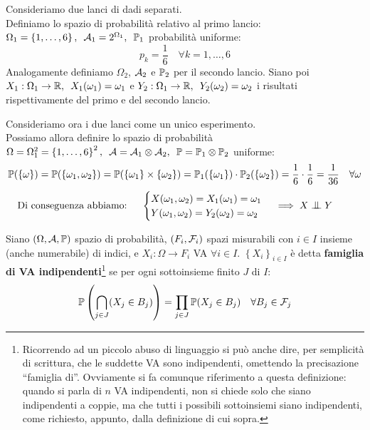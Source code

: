 \begin{ese}
  Consideriamo due lanci di dadi separati. \\
  Definiamo lo spazio di probabilità relativo al primo lancio: $\Omega_1 = \left \{1, \dots , 6 \right \}, \enspace  \mathcal A_1=2^{\Omega_1}, \enspace \mathbb P_1$ probabilità uniforme:
    $$p_k= \frac{1}{6} \quad \forall k=1, \dots , 6$$
  Analogamente definiamo $\Omega_2$, $\mathcal A_2$ e $\mathbb P_2$ per il secondo lancio.
  Siano poi $X_1: \Omega_1 \to \mathbb R, \enspace X_1(\omega_1)=\omega_1$ e $Y_2: \Omega_1 \to \mathbb R, \enspace Y_2(\omega_2)=\omega_2$ i risultati rispettivamente del primo e del secondo lancio.

  Consideriamo ora i due lanci come un unico esperimento. \\
  Possiamo allora definire lo spazio di probabilità $\Omega=\Omega_1^2= \left \{1, \dots, 6 \right \}^2, \enspace \mathcal A= \mathcal A_1 \otimes \mathcal A_2, \enspace \mathbb P= \mathbb P_1 \otimes \mathbb P_2$ uniforme:
  $$\mathbb P(\left \{ \omega \right \})=\mathbb P( \left \{ \omega_1, \omega_2 \right \}) = \mathbb P( \left \{ \omega_1 \right \} \times \left \{ \omega_2 \right \} ) = \mathbb P_1( \left \{ \omega_1 \right \}) \cdot \mathbb P_2( \left \{ \omega_2 \right \})= \frac{1}{6} \cdot \frac{1}{6}= \frac{1}{36} \quad\forall \omega$$
  $$ \text{Di conseguenza abbiamo: }
  \quad\begin{cases}
  X(\omega_1, \omega_2)= X_1(\omega_1)= \omega_1\\
  Y(\omega_1, \omega_2)= Y_2(\omega_2)=\omega_2
  \end{cases} \implies X \indep Y \qquad$$
\end{ese}

\medskip
\begin{defn}
  Siano $(\Omega, \mathcal A, \mathbb P)$ spazio di probabilità, $(F_i, \mathcal F_i)$ spazi misurabili con $i \in I$ insieme (anche numerabile) di indici, e $X_i: \Omega \to F_i$ VA $ \forall i \in I$.
  $\left \{ X_i \right \}_{i \in I}$ è detta \textbf{famiglia di VA indipendenti}\footnote{Ricorrendo ad un piccolo abuso di linguaggio si può anche dire, per semplicità di scrittura, che le suddette VA sono indipendenti, omettendo la precisazione ``famiglia di''. Ovviamente si fa comunque riferimento a questa definizione: quando si parla di $n$ VA indipendenti, non si chiede solo che siano indipendenti a coppie, ma che tutti i possibili sottoinsiemi siano indipendenti, come richiesto, appunto, dalla definizione di cui sopra.}
  se per ogni sottoinsieme finito $J$ di $I$:
  $$\mathbb P\left(\bigcap_{j \in J}(X_j \in B_j)\right) = \prod_{j \in J}\mathbb P(X_j \in B_j) \quad \forall B_j \in \mathcal F_j$$
\end{defn}

